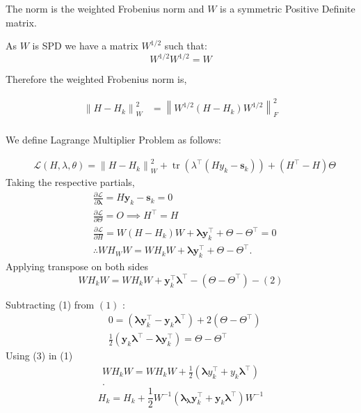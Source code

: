 \documentclass[12pt]{report}
\begin{document}
The norm is the weighted Frobenius norm and $W$ is a symmetric Positive Definite matrix.

As $W$ is SPD we have a matrix $W^{1/2}$ such that:\\
$$
	W^{1 / 2} W^{1 / 2}=W
$$

Therefore the weighted Frobenius norm is,

$$
	\begin{aligned}
		\left\|H-H_{k}\right\|_{W}^{2} & =\left\|W^{1 / 2}\left(H-H_{k}\right) W^{1 / 2}\right\|_{ F}^{2} \\
	\end{aligned}
$$

We define Lagrange Multiplier Problem as follows:

\begin{align}
	 & \mathcal L(H, \lambda, \theta)=\left\|H-H_{k}\right\|_{W}^{2}+\operatorname{tr}\left(\lambda^{\top}\left(H y_{k}-\bm{s}_k\right)\right) +\left(H^{\top}-H\right) \Theta
\end{align}
Taking the respective partials,
\begin{align*}
	 & \frac{\partial\mathcal L}{\partial \bm{\lambda}}=H \bm{y}_k-\bm{s}_{k}=0 \\
	 & \frac{\partial\mathcal L}{\partial \Theta}= O \implies H^{\top}=H \\
	 & \frac{\partial\mathcal L}{\partial H}=W\left(H-H_{k}\right) W+\bm{\lambda} \bm{y}_k^{\top}+\Theta-\Theta^{\top}=0 \\
	 & \therefore W H_{W} W=W H_{k} W+ \bm{\lambda} \bm{y}_k^{\top}+\Theta-\Theta^{\top}
	.\end{align*}
Applying transpose on both sides
$$
	W H_{k} W=W H_{k} W+\bm{y}_k^{\top} \bm{\lambda}^{\top}-\left(\Theta-\Theta^{\top}\right)-(2)
$$

Subtracting (1) from $(1)$ :
\begin{align*}
	 & 0=\left(\bm \lambda  \bm{y}_k^{\top}- \bm y_{k} \bm \lambda^{\top}\right)+2\left(\Theta-\Theta^{\top}\right) \\
	 & \frac{1}{2}\left(\bm y_{k} \bm \lambda^{\top}-\bm \lambda \bm y_{k}^{\top}\right)=\Theta-\Theta^{\top} \tag{3}
\end{align*}
Using (3) in (1)
\begin{align*}
	W H_{k} W=W H_{k} W+\frac{1}{2}\left(\bm{\lambda} y_{k}^{\top}+y_{k} \bm{\lambda}^{\top}\right) \\
	.\end{align*}
$$
	H_{k}=H_{k}+\frac{1}{2} W^{-1}\left(\bm{\lambda}_{\bm{\lambda}} \bm{y}_k^{\top}+\bm{y}_{k} \bm \lambda^{\top}\right) W^{-1}
$$
\end{document}
